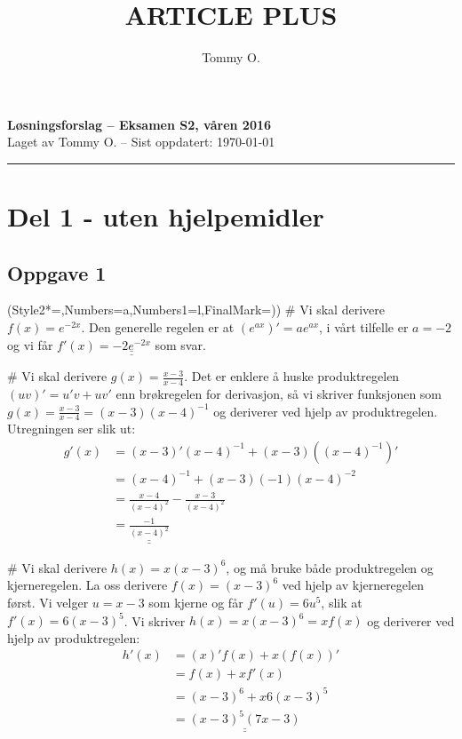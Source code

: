 \documentclass[12pt, a4paper]
{article}						%
\title{ARTICLE PLUS}
\author{Tommy O.}
\def\answer#1{\underline{\underline{#1}}}
\begin{document}
\pagestyle{fancy}
{\bfseries \Large Løsningsforslag -- Eksamen S2, våren 2016} \\
{ \footnotesize Laget av Tommy O. -- Sist oppdatert: \today}
\hrule

\section*{Del 1 - uten hjelpemidler}
\subsection*{Oppgave 1}
\begin{easylist}[enumerate]
\ListProperties(Style2*=,Numbers=a,Numbers1=l,FinalMark={)})
# Vi skal derivere $f(x) = e^{-2x}$. Den generelle regelen er at $\left( e^{ax} \right)' = a e^{ax}$, i vårt tilfelle er $a = -2$ og vi får $f'(x) = \answer{-2 e^{-2x}}$ som svar.

# Vi skal derivere $g(x) = \frac{x-3}{x-4}$. Det er enklere å huske produktregelen $\left(uv\right)' = u'v + uv'$ enn brøkregelen for derivasjon, så vi skriver funksjonen som $g(x) = \frac{x-3}{x-4} = \left( x-3 \right) \left( x-4 \right)^{-1}$ og deriverer ved hjelp av produktregelen. Utregningen ser slik ut:
\begin{align*}
	g'(x) &= \left( x-3 \right)' \left( x-4 \right)^{-1} + \left( x-3 \right) \left(\left( x-4 \right)^{-1}\right)' \\
	&= \left( x-4 \right)^{-1} + \left( x-3 \right) (-1 )\left( x-4 \right)^{-2} \\
	&= \frac{x-4}{\left( x-4 \right)^{2}} - \frac{x-3}{\left( x-4 \right)^{2}} \\
	&= \answer{\frac{-1}{\left( x-4 \right)^{2}}}
\end{align*}

# Vi skal derivere $h(x) = x \left(x-3\right)^6$, og må bruke både produktregelen og kjerneregelen.
La oss derivere $f(x) = \left(x-3\right)^6$ ved hjelp av kjerneregelen først. Vi velger $u = x-3$ som kjerne og får $f'(u) = 6u^5$, slik at $f'(x) = 6\left(x-3\right)^5$. Vi skriver $h(x) = x  \left(x-3\right)^6= x f(x) $ og deriverer ved hjelp av produktregelen:
\begin{align*}
	h'(x) &= \left( x \right)' f(x) + x \left( f(x) \right)' \\
	&= f(x) + xf'(x) \\
	&= \left(x-3\right)^6 + x6\left(x-3\right)^5 \\
	&= \answer{\left(x-3\right)^5 \left( 7x - 3\right)}
\end{align*}
\end{easylist}
\end{document}

